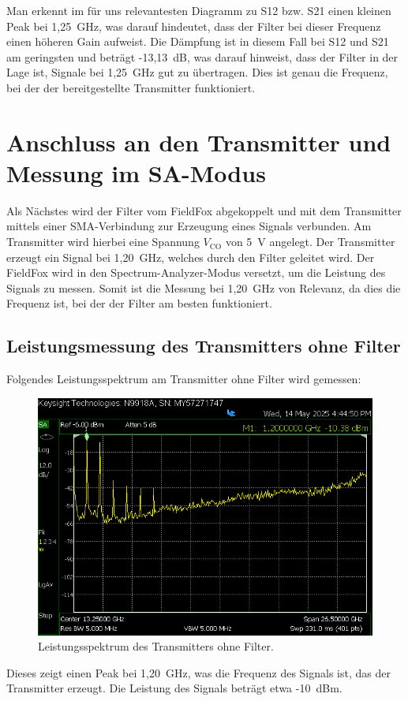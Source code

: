     Man erkennt im für uns relevantesten Diagramm zu S12 bzw. S21 einen kleinen Peak bei 1,25~GHz, was darauf hindeutet, dass der Filter bei dieser Frequenz einen höheren Gain aufweist. Die Dämpfung ist in diesem Fall bei S12 und S21 am geringsten und beträgt -13,13~dB, was darauf hinweist, dass der Filter in der Lage ist, Signale bei 1,25~GHz gut zu übertragen.
    Dies ist genau die Frequenz, bei der der bereitgestellte Transmitter funktioniert.
\section{Anschluss an den Transmitter und Messung im SA-Modus}
    Als Nächstes wird der Filter vom FieldFox abgekoppelt und mit dem Transmitter mittels einer SMA-Verbindung zur Erzeugung eines Signals verbunden. Am Transmitter wird hierbei eine Spannung $V_\mathrm{CO}$ von 5~V angelegt.
    Der Transmitter erzeugt ein Signal bei 1,20~GHz, welches durch den Filter geleitet wird. Der FieldFox wird in den Spectrum-Analyzer-Modus versetzt, um die Leistung des Signals zu messen. 
    Somit ist die Messung bei 1,20~GHz von Relevanz, da dies die Frequenz ist, bei der der Filter am besten funktioniert.

    \subsection{Leistungsmessung des Transmitters ohne Filter}
    Folgendes Leistungsspektrum am Transmitter ohne Filter wird gemessen:
    \begin{figure}[H]
        \centering
        \includegraphics[width=0.6\linewidth]{Pictures/SA-TranceiverohnegutFIlterPeakCooleGrupp.png}
        \caption{Leistungsspektrum des Transmitters ohne Filter.}
        \label{fig:transmitter_spectrum_without_filter}
    \end{figure}
    Dieses zeigt einen Peak bei 1,20~GHz, was die Frequenz des Signals ist, das der Transmitter erzeugt. Die Leistung des Signals beträgt etwa -10~dBm.
